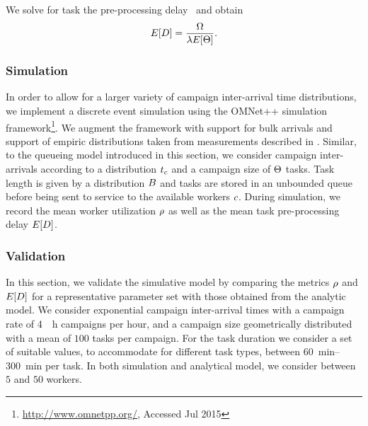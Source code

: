 We solve for task the pre-processing delay \preTaskProcessingDelay~and obtain
\[E[D] = \frac{\Omega}{\lambda E[\Theta]}.\]

\subsubsection*{Simulation}

In order to allow for a larger variety of campaign inter-arrival time distributions, we implement a discrete event simulation using the OMNet++ simulation framework\footnote{\url{http://www.omnetpp.org/}, Accessed Jul 2015}.
We augment the framework with support for bulk arrivals and support of empiric distributions taken from measurements described in .
Similar, to the queueing model introduced in this section, we consider campaign inter-arrivals according to a distribution \(t_c\) and a campaign size of \(\Theta\) tasks.
Task length is given by a distribution \(B\) and tasks are stored in an unbounded queue before being sent to service to the available workers \(c\).
During simulation, we record the mean worker utilization \(\rho\) as well as the mean task pre-processing delay \(E[D]\).

\subsubsection*{Validation}

In this section, we validate the simulative model by comparing the metrics \(\rho\) and \(E[D]\) for a representative parameter set with those obtained from the analytic model.
We consider exponential campaign inter-arrival times with a campaign rate of \SI{4}{\per\hour}  campaigns per hour, and a campaign size \campaignSize geometrically distributed with a mean of \(100\) tasks per campaign.
For the task duration \taskDuration we consider a set of suitable values, to accommodate for different task types, between \SIrange{60}{300}{\minute} per task.
In both simulation and analytical model, we consider between $5$ and $50$ workers.
